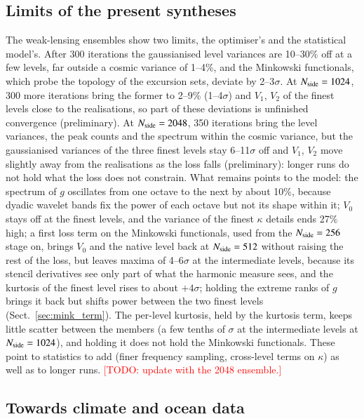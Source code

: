 \documentclass{aa}
\newcommand{\todo}[1]{\textcolor{red}{[TODO: #1]}}
\newcommand{\nside}{N_{\rm side}}
\begin{document}
\subsection{Limits of the present syntheses}

The weak-lensing ensembles show two limits, the optimiser's and the statistical model's. After 300 iterations the gaussianised level variances are 10--30\% off at a few levels, far outside a cosmic variance of 1--4\%, and the Minkowski functionals, which probe the topology of the excursion sets, deviate by 2--3$\sigma$. At $\nside=1024$, 300 more iterations bring the former to 2--9\% (1--4$\sigma$) and $V_1$, $V_2$ of the finest levels close to the realisations, so part of these deviations is unfinished convergence (preliminary). At $\nside=2048$, 350 iterations bring the level variances, the peak counts and the spectrum within the cosmic variance, but the gaussianised variances of the three finest levels stay 6--11$\sigma$ off and $V_1$, $V_2$ move slightly away from the realisations as the loss falls (preliminary): longer runs do not hold what the loss does not constrain. What remains points to the model: the spectrum of $g$ oscillates from one octave to the next by about 10\%, because dyadic wavelet bands fix the power of each octave but not its shape within it; $V_0$ stays off at the finest levels, and the variance of the finest $\kappa$ details ends 27\% high; a first loss term on the Minkowski functionals, used from the $\nside=256$ stage on, brings $V_0$ and the native level back at $\nside=512$ without raising the rest of the loss, but leaves maxima of 4--6$\sigma$ at the intermediate levels, because its stencil derivatives see only part of what the harmonic measure sees, and the kurtosis of the finest level rises to about $+4\sigma$; holding the extreme ranks of $g$ brings it back but shifts power between the two finest levels (Sect.~\ref{sec:mink_term}). The per-level kurtosis, held by the kurtosis term, keeps little scatter between the members (a few tenths of $\sigma$ at the intermediate levels at $\nside=1024$), and holding it does not hold the Minkowski functionals. These point to statistics to add (finer frequency sampling, cross-level terms on $\kappa$) as well as to longer runs. \todo{update with the 2048 ensemble.} %

\subsection{Towards climate and ocean data}
\end{document}
